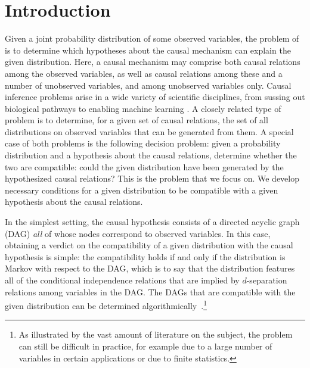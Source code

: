 \documentclass[aps,english,10pt,superscriptaddress,onecolumn,twoside,longbibliography,pra,floatfix,fleqn,nofootinbib]{revtex4-1}
\newcommand*{\tblue}[1]{{\color{medblue}{\textbf{#1}}}}
\theoremstyle{definition}
\newcounter{example}[section]
\begin{document}
\maketitle
\tableofcontents

\section{Introduction}

Given a joint probability distribution of some observed variables, the problem of \tblue{causal inference} is to determine which hypotheses about the causal mechanism can explain the given distribution. Here, a causal mechanism may comprise both causal relations among the observed variables, as well as causal relations among these and a number of unobserved variables, and among unobserved variables only. Causal inference problems arise in a wide variety of scientific disciplines, from sussing out biological pathways to enabling machine learning \cite{pearl2009causality,spirtes2011causation,studeny2005probabilistic,koller2009probabilistic}. A closely related type of problem is to determine, for a given set of causal relations, the set of all distributions on observed variables that can be generated from them.   
A special case of both problems is the following decision problem: given a probability distribution and a hypothesis about the causal relations, determine whether the two are compatible: could the given distribution have been generated by the hypothesized causal relations? This is the problem that we focus on.
We develop necessary conditions for a given distribution to be compatible with a given hypothesis about the causal relations.

In the simplest setting, the causal hypothesis consists of a directed acyclic graph (DAG) {\em all} of whose nodes correspond to observed variables. In this case, obtaining a verdict on the compatibility of a given distribution with the causal hypothesis is simple: the compatibility holds if and only if the distribution is Markov with respect to the DAG, which is to say that the distribution features all of the conditional independence relations that are implied by $d$-separation relations among variables in the DAG. The DAGs that are compatible with the given distribution can be determined algorithmically~\cite{pearl2009causality}.\footnote{As illustrated by the vast amount of literature on the subject, the problem can still be difficult in practice, for example due to a large number of variables in certain applications or due to finite statistics.}
\end{document}
